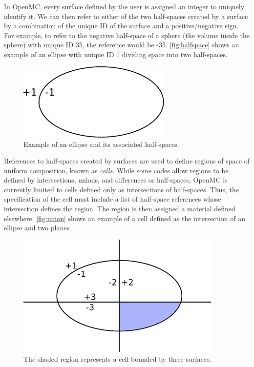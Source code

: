 In OpenMC, every surface defined by the user is assigned an integer to uniquely
identify it. We can then refer to either of the two half-spaces created by a
surface by a combination of the unique ID of the surface and a positive/negative
sign. For example, to refer to the negative half-space of a sphere (the volume
inside the sphere) with unique ID 35, the reference would be
-35. \autoref{fig:halfspace} shows an example of an ellipse with unique ID 1
dividing space into two half-spaces.
\begin{figure}[htb]
  \centering
  \includegraphics[width=3.0in]{figures/ch2/halfspace.pdf}
  \caption{Example of an ellipse and its associated half-spaces.}
  \label{fig:halfspace}
\end{figure}

References to half-spaces created by surfaces are used to define regions of
space of uniform composition, known as \emph{cells}. While some codes allow
regions to be defined by intersections, unions, and differences or half-spaces,
OpenMC is currently limited to cells defined only as intersections of
half-spaces. Thus, the specification of the cell must include a list of
half-space references whose intersection defines the region. The region is then
assigned a material defined elsewhere. \autoref{fig:union} shows an example of a
cell defined as the intersection of an ellipse and two planes.
\begin{figure}[htb]
  \centering
  \includegraphics[width=4.0in]{figures/ch2/union.pdf}
  \caption{The shaded region represents a cell bounded by three surfaces.}
  \label{fig:union}
\end{figure}


